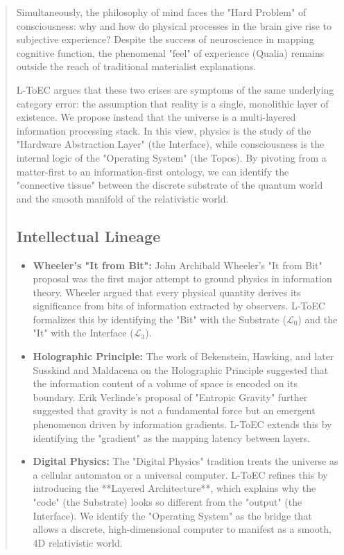 \documentclass[11pt,titlepage]{article}
\newcommand{\substrate}{\mathcal{L}_0}
\newcommand{\interface}{\mathcal{L}_3}
\begin{document}
\begin{abstract}
Simultaneously, the philosophy of mind faces the "Hard Problem" of consciousness: why and how do physical processes in the brain give rise to subjective experience? Despite the success of neuroscience in mapping cognitive function, the phenomenal "feel" of experience (Qualia) remains outside the reach of traditional materialist explanations.

L-ToEC argues that these two crises are symptoms of the same underlying category error: the assumption that reality is a single, monolithic layer of existence. We propose instead that the universe is a multi-layered information processing stack. In this view, physics is the study of the "Hardware Abstraction Layer" (the Interface), while consciousness is the internal logic of the "Operating System" (the Topos). By pivoting from a matter-first to an information-first ontology, we can identify the "connective tissue" between the discrete substrate of the quantum world and the smooth manifold of the relativistic world.

\subsection{Intellectual Lineage}
\begin{itemize}
    
\item \textbf{Wheeler's "It from Bit":} John Archibald Wheeler's "It from Bit" proposal was the first major attempt to ground physics in information theory. Wheeler argued that every physical quantity derives its significance from bits of information extracted by observers. L-ToEC formalizes this by identifying the "Bit" with the Substrate ($\substrate$) and the "It" with the Interface ($\interface$).
    
\item \textbf{Holographic Principle:} The work of Bekenstein, Hawking, and later Susskind and Maldacena on the Holographic Principle suggested that the information content of a volume of space is encoded on its boundary. Erik Verlinde's proposal of "Entropic Gravity" further suggested that gravity is not a fundamental force but an emergent phenomenon driven by information gradients. L-ToEC extends this by identifying the "gradient" as the mapping latency between layers.
    
\item \textbf{Digital Physics:} The "Digital Physics" tradition treats the universe as a cellular automaton or a universal computer. L-ToEC refines this by introducing the **Layered Architecture**, which explains why the "code" (the Substrate) looks so different from the "output" (the Interface). We identify the "Operating System" as the bridge that allows a discrete, high-dimensional computer to manifest as a smooth, 4D relativistic world.
\end{itemize}


\end{abstract}
\end{document}
